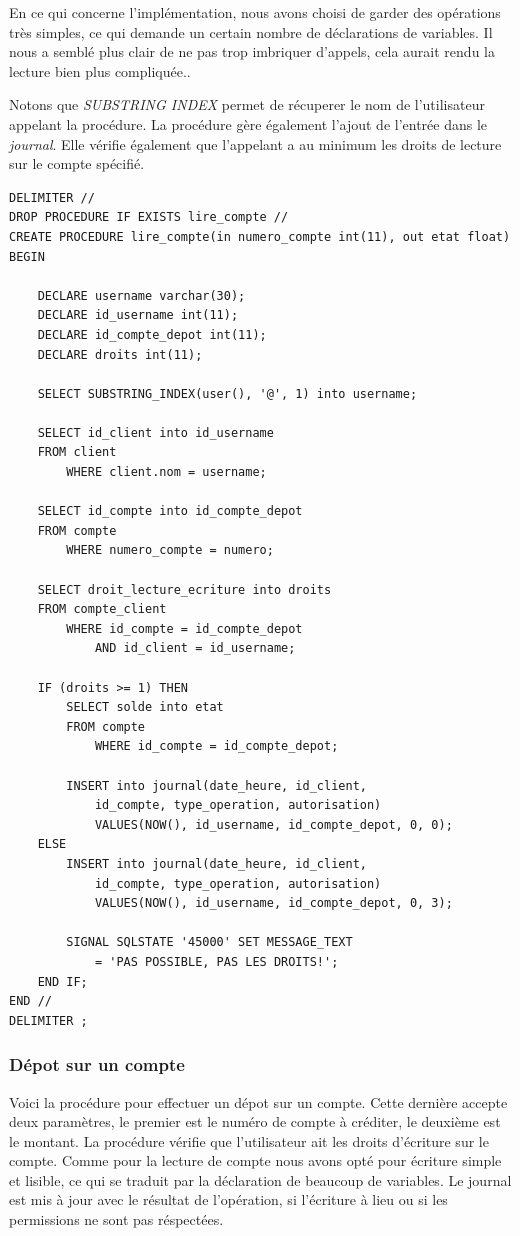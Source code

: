 \documentclass[paper=a4, fontsize=11pt]{scrartcl} %
\numberwithin{equation}{section} %
\numberwithin{figure}{section} %
\numberwithin{table}{section} %
\begin{document}
En ce qui concerne l'implémentation, nous avons choisi de garder des opérations très simples, ce qui demande un certain nombre de déclarations de variables. Il nous a semblé plus clair de ne pas trop imbriquer d'appels, cela aurait rendu la lecture bien plus compliquée..

Notons que \textit{SUBSTRING INDEX} permet de récuperer le nom de l'utilisateur appelant la procédure. La procédure gère également l'ajout de l'entrée dans le \textit{journal}. Elle vérifie également que l'appelant a au minimum les droits de lecture sur le compte spécifié.

\begin{lstlisting}
DELIMITER //
DROP PROCEDURE IF EXISTS lire_compte //
CREATE PROCEDURE lire_compte(in numero_compte int(11), out etat float)
BEGIN
	
    DECLARE username varchar(30);
    DECLARE id_username int(11);
	DECLARE id_compte_depot int(11);
    DECLARE droits int(11);
    
    SELECT SUBSTRING_INDEX(user(), '@', 1) into username;
    
    SELECT id_client into id_username
    FROM client 
		WHERE client.nom = username;
        
	SELECT id_compte into id_compte_depot
    FROM compte
		WHERE numero_compte = numero;
        
	SELECT droit_lecture_ecriture into droits
    FROM compte_client
		WHERE id_compte = id_compte_depot 
			AND id_client = id_username;
			 
    IF (droits >= 1) THEN
		SELECT solde into etat
		FROM compte 
			WHERE id_compte = id_compte_depot;
		
        INSERT into journal(date_heure, id_client,
        	id_compte, type_operation, autorisation)
			VALUES(NOW(), id_username, id_compte_depot, 0, 0);
	ELSE
		INSERT into journal(date_heure, id_client,
			id_compte, type_operation, autorisation)
			VALUES(NOW(), id_username, id_compte_depot, 0, 3);
            
		SIGNAL SQLSTATE '45000' SET MESSAGE_TEXT 
			= 'PAS POSSIBLE, PAS LES DROITS!';
	END IF;
END //
DELIMITER ;
\end{lstlisting}


\subsubsection{Dépot sur un compte}
Voici la procédure pour effectuer un dépot sur un compte. Cette dernière accepte deux paramètres, le premier est le numéro de compte à créditer, le deuxième est le montant. La procédure vérifie que l'utilisateur ait les droits d'écriture sur le compte. Comme pour la lecture de compte nous avons opté pour écriture simple et lisible, ce qui se traduit par la déclaration de beaucoup de variables. Le journal est mis à jour avec le résultat de l'opération, si l'écriture à lieu ou si les permissions ne sont pas réspectées.
\end{document}
